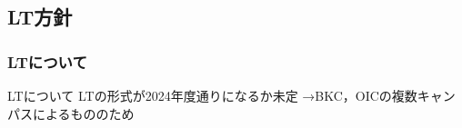 \subsection*{LT方針}


\subsubsection*{LTについて}
LTについて
 LTの形式が2024年度通りになるか未定
  →BKC，OICの複数キャンパスによるもののため

